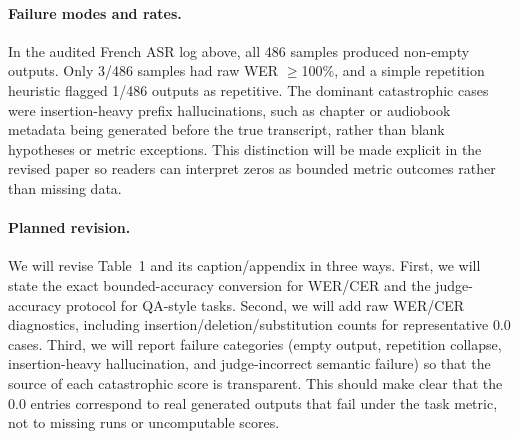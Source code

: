 \begin{answer}
    \paragraph{Failure modes and rates.}
    In the audited French ASR log above, all 486 samples produced non-empty outputs.
    Only 3/486 samples had raw WER $\geq$100\%, and a simple repetition heuristic flagged 1/486 outputs as repetitive.
    The dominant catastrophic cases were insertion-heavy prefix hallucinations, such as chapter or audiobook metadata being generated before the true transcript, rather than blank hypotheses or metric exceptions.
    This distinction will be made explicit in the revised paper so readers can interpret zeros as bounded metric outcomes rather than missing data.

    \paragraph{Planned revision.}
    We will revise Table~1 and its caption/appendix in three ways.
    First, we will state the exact bounded-accuracy conversion for WER/CER and the judge-accuracy protocol for QA-style tasks.
    Second, we will add raw WER/CER diagnostics, including insertion/deletion/substitution counts for representative 0.0 cases.
    Third, we will report failure categories (empty output, repetition collapse, insertion-heavy hallucination, and judge-incorrect semantic failure) so that the source of each catastrophic score is transparent.
    This should make clear that the 0.0 entries correspond to real generated outputs that fail under the task metric, not to missing runs or uncomputable scores.
\end{answer}

